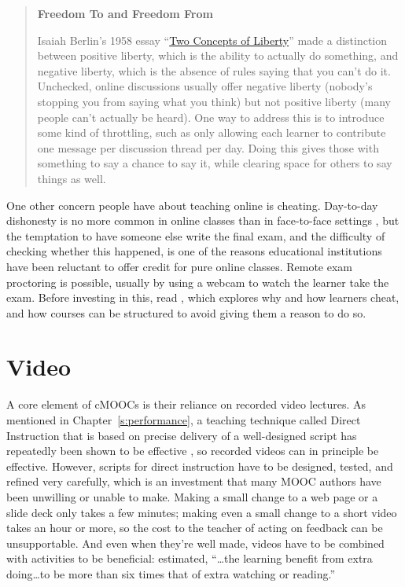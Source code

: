\begin{quote}\setlength{\parindent}{0pt}
\textbf{Freedom To and Freedom From}

Isaiah Berlin's 1958 essay ``\href{https://en.wikipedia.org/wiki/Two_Concepts_of_Liberty}{Two Concepts of
Liberty}'' made a distinction between positive
liberty, which is the ability to actually do something, and negative
liberty, which is the absence of rules saying that you can't do
it. Unchecked, online discussions usually offer negative liberty
(nobody's stopping you from saying what you think) but not positive
liberty (many people can't actually be heard). One way to address
this is to introduce some kind of throttling, such as only allowing
each learner to contribute one message per discussion thread per
day. Doing this gives those with something to say a chance to say
it, while clearing space for others to say things as well.
\end{quote}

One other concern people have about teaching online is cheating.
Day-to-day dishonesty is no more common in online classes than in
face-to-face settings \cite{Beck2014}, but the temptation to have
someone else write the final exam, and the difficulty of checking
whether this happened, is one of the reasons educational institutions
have been reluctant to offer credit for pure online classes. Remote exam
proctoring is possible, usually by using a webcam to watch the learner
take the exam. Before investing in this, read \cite{Lang2013}, which
explores why and how learners cheat, and how courses can be structured
to avoid giving them a reason to do so.

\section{Video}\label{s:online-video}

A core element of cMOOCs is their reliance on recorded video lectures.
As mentioned in Chapter~\ref{s:performance}, a teaching technique called
Direct Instruction that is based on precise delivery of a well-designed
script has repeatedly been shown to be effective \cite{Stoc2018}, so
recorded videos can in principle be effective. However, scripts for
direct instruction have to be designed, tested, and refined very
carefully, which is an investment that many MOOC authors have been
unwilling or unable to make. Making a small change to a web page or a
slide deck only takes a few minutes; making even a small change to a
short video takes an hour or more, so the cost to the teacher of acting
on feedback can be unsupportable. And even when they're well made,
videos have to be combined with activities to be beneficial:
\cite{Koed2015} estimated, ``\ldots{}the learning benefit from
extra doing\ldots{}to be more than six times that of extra
watching or reading.''

